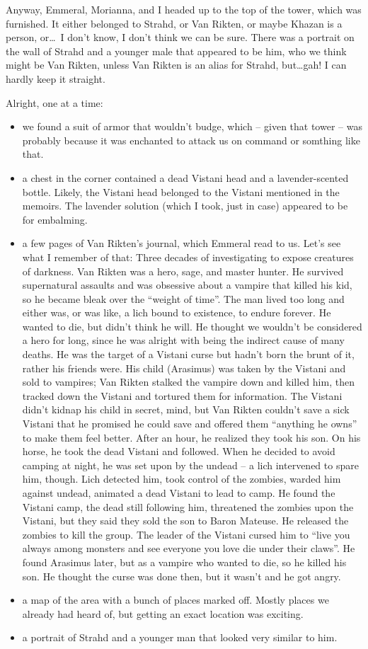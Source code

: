 Anyway, Emmeral, Morianna, and I headed up to the top of the tower, which was furnished. It either belonged to Strahd, or Van Rikten, or maybe Khazan is a person, or\dots\ I don't know, I don't think we can be sure. There was a portrait on the wall of Strahd and a younger male that appeared to be him, who we think might be Van Rikten, unless Van Rikten is an alias for Strahd, but\dots gah! I can hardly keep it straight.

Alright, one at a time:
\begin{itemize}
\item we found a suit of armor that wouldn't budge, which -- given that tower -- was probably because it was enchanted to attack us on command or somthing like that.
\item a chest in the corner contained a dead Vistani head and a lavender-scented bottle. Likely, the Vistani head belonged to the Vistani mentioned in the memoirs. The lavender solution (which I took, just in case) appeared to be for embalming.
\item a few pages of Van Rikten's journal, which Emmeral read to us. Let's see what I remember of that: Three decades of investigating to expose creatures of darkness. Van Rikten was a hero, sage, and master hunter. He survived supernatural assaults and was obsessive about a vampire that killed his kid, so he became bleak over the ``weight of time''. The man lived too long and either was, or was like, a lich bound to existence, to endure forever. He wanted to die, but didn't think he will. He thought we wouldn't be considered a hero for long, since he was alright with being the indirect cause of many deaths. He was the target of a Vistani curse but hadn't born the brunt of it, rather his friends were. His child (Arasimus) was taken by the Vistani and sold to vampires; Van Rikten stalked the vampire down and killed him, then tracked down the Vistani and tortured them for information. The Vistani didn't kidnap his child in secret, mind, but Van Rikten couldn't save a sick Vistani that he promised he could save and offered them ``anything he owns'' to make them feel better. After an hour, he realized they took his son. On his horse, he took the dead Vistani and followed. When he decided to avoid camping at night, he was set upon by the undead -- a lich intervened to spare him, though. Lich detected him, took control of the zombies, warded him against undead, animated a dead Vistani to lead to camp. He found the Vistani camp, the dead still following him, threatened the zombies upon the Vistani, but they said they sold the son to Baron Mateuse. He released the zombies to kill the group. The leader of the Vistani cursed him to ``live you always among monsters and see everyone you love die under their claws''. He found Arasimus later, but as a vampire who wanted to die, so he killed his son. He thought the curse was done then, but it wasn't and he got angry.
\item a map of the area with a bunch of places marked off. Mostly places we already had heard of, but getting an exact location was exciting.
\item a portrait of Strahd and a younger man that looked very similar to him.
\end{itemize}

